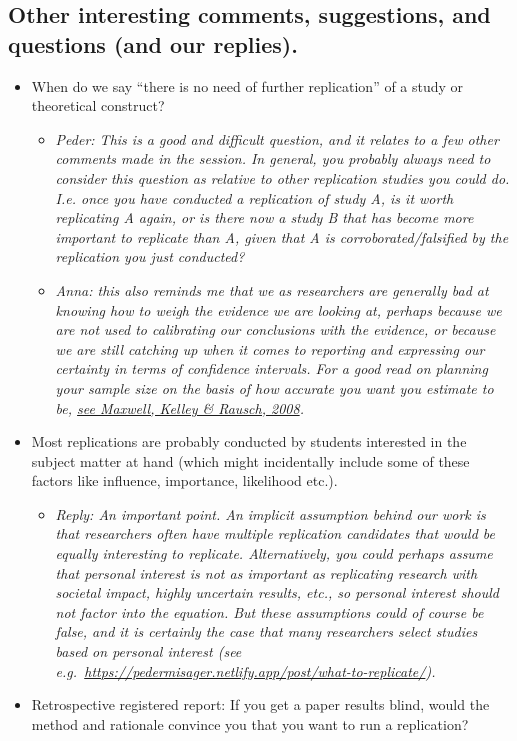 \documentclass[
]{article}
\providecommand{\tightlist}{%
  \setlength{\itemsep}{0pt}\setlength{\parskip}{0pt}}
\begin{document}
\hypertarget{other-interesting-comments-suggestions-and-questions-and-our-replies.}{%
\subsection{Other interesting comments, suggestions, and questions (and
our
replies).}\label{other-interesting-comments-suggestions-and-questions-and-our-replies.}}

\begin{itemize}
\item
  When do we say ``there is no need of further replication'' of a study
  or theoretical construct?

  \begin{itemize}
  \item
    \emph{Peder: This is a good and difficult question, and it relates
    to a few other comments made in the session. In general, you
    probably always need to consider this question as relative to other
    replication studies you could do. I.e. once you have conducted a
    replication of study A, is it worth replicating A again, or is there
    now a study B that has become more important to replicate than A,
    given that A is corroborated/falsified by the replication you just
    conducted? }
  \item
    \emph{Anna: this also reminds me that we as researchers are
    generally bad at knowing how to weigh the evidence we are looking
    at, perhaps because we are not used to calibrating our conclusions
    with the evidence, or because we are still catching up when it comes
    to reporting and expressing our certainty in terms of confidence
    intervals. For a good read on planning your sample size on the basis
    of how accurate you want you estimate to be,
    \href{10.1146/annurev.psych.59.103006.093735}{see Maxwell, Kelley \&
    Rausch, 2008}.}
  \end{itemize}
\item
  Most replications are probably conducted by students interested in the
  subject matter at hand (which might incidentally include some of these
  factors like influence, importance, likelihood etc.).

  \begin{itemize}
  \tightlist
  \item
    \emph{Reply: An important point. An implicit assumption behind our
    work is that researchers often have multiple replication candidates
    that would be equally interesting to replicate. Alternatively, you
    could perhaps assume that personal interest is not as important as
    replicating research with societal impact, highly uncertain results,
    etc., so personal interest should not factor into the equation. But
    these assumptions could of course be false, and it is certainly the
    case that many researchers select studies based on personal interest
    (see
    e.g.~\url{https://pedermisager.netlify.app/post/what-to-replicate/}).}
  \end{itemize}
\item
  Retrospective registered report: If you get a paper results blind,
  would the method and rationale convince you that you want to run a
  replication?


\end{itemize}
\end{document}
